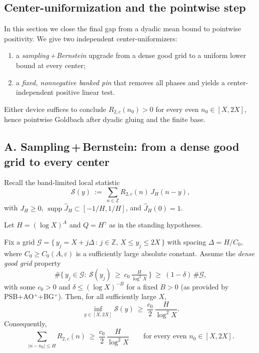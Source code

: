 \subsection{Center-uniformization and the pointwise step}\label{sec:center-uniform}

In this section we close the final gap from a dyadic mean bound to pointwise positivity.
We give two independent center-uniformizers:

\begin{enumerate}
  \item[\textbf{A}.] a \emph{sampling\,+\,Bernstein} upgrade from a dense good grid to a uniform lower bound at every center; 
  \item[\textbf{B}.] a \emph{fixed, nonnegative banked pin} that removes all phases and yields a center-independent positive linear test.
\end{enumerate}

Either device suffices to conclude $R_{2,c}(n_0)>0$ for every even $n_0\in[X,2X]$, hence pointwise Goldbach after dyadic gluing and the finite base.

\subsection*{A. Sampling\,+\,Bernstein: from a dense good grid to every center}\label{subsec:sampling-bernstein}

Recall the band-limited local statistic
\[
  \mathcal{S}(y)\ :=\ \sum_{n\in\mathbb{Z}} R_{2,c}(n)\,J_H(n-y),
\]
with $J_H\ge0$, $\operatorname{supp}\widehat J_H\subset[-1/H,1/H]$, and $\widehat J_H(0)=1$.

Let $H=(\log X)^A$ and $Q=H^\gamma$ as in the standing hypotheses.

\begin{lemma}\label{lem:sampling-bernstein}
Fix a grid $\mathcal{G}=\{\,y_j=X+j\Delta\,:\,j\in\mathbb{Z},\,X\le y_j\le 2X\,\}$ with spacing $\Delta=H/C_0$, where $C_0\ge C_0(A,\varepsilon)$ is a sufficiently large absolute constant.
Assume the \emph{dense good grid} property
\[
  \#\big\{\,y_j\in\mathcal{G}:\ \mathcal{S}(y_j)\ \ge\ c_0\,\tfrac{H}{\log^2 X}\,\big\}
  \ \ge\ (1-\delta)\,\#\mathcal{G},
\]
with some $c_0>0$ and $\delta\le(\log X)^{-B}$ for a fixed $B>0$ (as provided by \textnormal{PSB}+AO$^+$+BG$^+$).
Then, for all sufficiently large $X$,
\[
  \inf_{y\in[X,2X]} \mathcal{S}(y)\ \ge\ \frac{c_0}{2}\,\frac{H}{\log^2 X}.
\]
Consequently,
\[
  \sum_{|n-n_0|\le H} R_{2,c}(n)\ \ge\ \frac{c_0}{2}\,\frac{H}{\log^2 X}
  \qquad\text{for every even }n_0\in[X,2X].
\]
\end{lemma}

